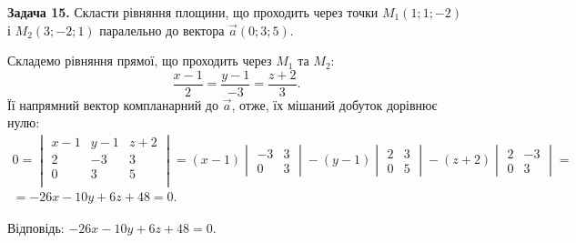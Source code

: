 \documentclass[14pt,draft]{extreport}
\begin{document}
\bigskip \textbf{Задача 15.} Скласти рівняння площини, що проходить
через точки $M_1(1;1;-2)$ і $M_2(3;-2;1)$ паралельно до вектора
$\vec{a}(0;3;5)$.\bigskip

%

Складемо рівняння прямої, що проходить через $M_1$ та $M_2$:
\begin{equation}
	\frac{x-1}{2}=
	\frac{y-1}{-3}=
	\frac{z+2}{3}.
\end{equation}
Її напрямний вектор компланарний до $\vec a$, отже,
їх мішаний добуток дорівнює нулю:
\begin{equation}
	\begin{aligned}
	0=\begin{vmatrix}
		x-1 & y-1 & z+2\\
		2 & -3 & 3\\
		0 & 3 & 5\\
	\end{vmatrix}=
	(x-1)\begin{vmatrix}
		-3 & 3 \\ 0 & 3
	\end{vmatrix}-
	(y-1)\begin{vmatrix}
		2 & 3 \\ 0 & 5
	\end{vmatrix}-
	(z+2)\begin{vmatrix}
		2 & -3 \\ 0 & 3
	\end{vmatrix}=\\
	=-26x-10y+6z+48=0.
	\end{aligned}
\end{equation}
\null\hfill
\begin{boxedminipage}{0.5\textwidth}
{Відповідь:} $-26x-10y+6z+48=0.$
\end{boxedminipage}\\
\end{document}
